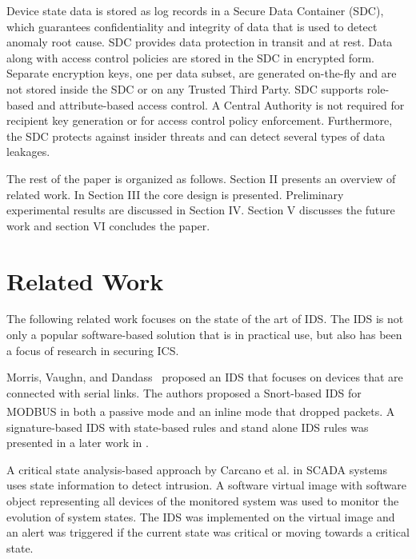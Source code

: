 \documentclass[conference]{IEEEtran}
\begin{document}
Device state data is stored as log records in a Secure Data Container (SDC), which guarantees confidentiality and integrity of data that is used to detect anomaly root cause. SDC provides data protection in transit and at rest. Data along with access control policies are stored in the SDC in encrypted form. Separate encryption keys, one per data subset, are generated on-the-fly and are not stored inside the SDC or on any Trusted Third Party. SDC supports role-based and attribute-based access control. A Central Authority is not required for recipient key generation or for access control policy enforcement. Furthermore, the SDC protects against insider threats and can detect several types of data leakages.      
\par The rest of the paper is organized as follows. Section II presents an overview of related work. In Section III the core design is presented. Preliminary experimental results are discussed in Section IV. Section V discusses the future work and section VI concludes the paper.  

\section{Related Work}
The following related work focuses on the state of the art of IDS. The IDS is not only a popular software-based solution that is in practical use, but also has been a focus of research in securing ICS.

\par Morris, Vaughn, and Dandass~\cite{c2} proposed an IDS that focuses on devices that are connected with serial links. The authors proposed a Snort-based IDS for MODBUS\textsuperscript{\textregistered} in both a passive mode and an inline mode that dropped packets. 
A signature-based IDS with state-based rules and stand alone IDS rules was presented in a later work in \cite{c9}.
\par A critical state analysis-based approach by Carcano et al. \cite{c4} in SCADA systems uses state information to detect intrusion. A software virtual image with software object representing all devices of the monitored system was used to monitor the evolution of system states. The IDS was implemented on the virtual image and an alert was triggered if the current state was critical or moving towards a critical state.
\end{document}
